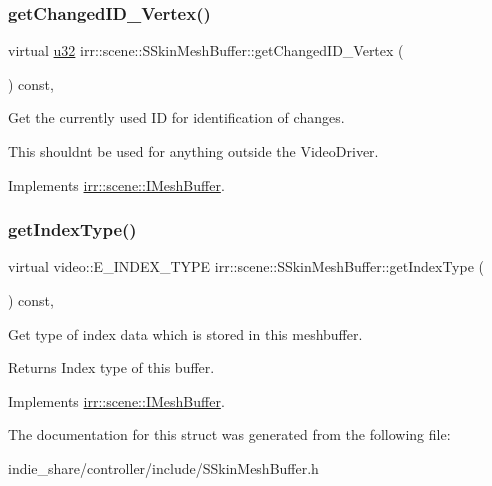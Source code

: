 \subsubsection{\texorpdfstring{get\+Changed\+I\+D\+\_\+\+Vertex()}{getChangedID\_Vertex()}}
{\footnotesize\ttfamily virtual \hyperlink{namespaceirr_a0416a53257075833e7002efd0a18e804}{u32} irr\+::scene\+::\+S\+Skin\+Mesh\+Buffer\+::get\+Changed\+I\+D\+\_\+\+Vertex (\begin{DoxyParamCaption}{ }\end{DoxyParamCaption}) const\hspace{0.3cm}{\ttfamily [inline]}, {\ttfamily [virtual]}}



Get the currently used ID for identification of changes. 

This shouldn\textquotesingle{}t be used for anything outside the Video\+Driver. 

Implements \hyperlink{classirr_1_1scene_1_1IMeshBuffer_aba48df31edf92a0117692c0be02298db}{irr\+::scene\+::\+I\+Mesh\+Buffer}.

\mbox{\label{structirr_1_1scene_1_1SSkinMeshBuffer_a0655e2196cb283a164580ada6c34aecf}} 
\subsubsection{\texorpdfstring{get\+Index\+Type()}{getIndexType()}}
{\footnotesize\ttfamily virtual video\+::\+E\+\_\+\+I\+N\+D\+E\+X\+\_\+\+T\+Y\+PE irr\+::scene\+::\+S\+Skin\+Mesh\+Buffer\+::get\+Index\+Type (\begin{DoxyParamCaption}{ }\end{DoxyParamCaption}) const\hspace{0.3cm}{\ttfamily [inline]}, {\ttfamily [virtual]}}



Get type of index data which is stored in this meshbuffer. 

\begin{DoxyReturn}{Returns}
Index type of this buffer. 
\end{DoxyReturn}


Implements \hyperlink{classirr_1_1scene_1_1IMeshBuffer_a8a993431c2c35420b62a577dc18dbdc2}{irr\+::scene\+::\+I\+Mesh\+Buffer}.



The documentation for this struct was generated from the following file\+:\begin{DoxyCompactItemize}
\item 
indie\+\_\+share/controller/include/S\+Skin\+Mesh\+Buffer.\+h\end{DoxyCompactItemize}
